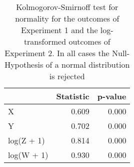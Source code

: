\begin{table}[ht]
\centering
\begin{tabular}{lrr}
  \hline
 & Statistic & p-value \\ 
  \hline
X & 0.609 & 0.000 \\ 
  Y & 0.702 & 0.000 \\ 
  log(Z + 1) & 0.814 & 0.000 \\ 
  log(W + 1) & 0.930 & 0.000 \\ 
   \hline
\end{tabular}
\caption{Kolmogorov-Smirnoff test for normality
                 for the outcomes of Experiment 1 and the log-transformed outcomes of
                 Experiment 2. In all cases the Null-Hypothesis of a normal distribution
                 is rejected} 
\label{tab:ks}
\end{table}
